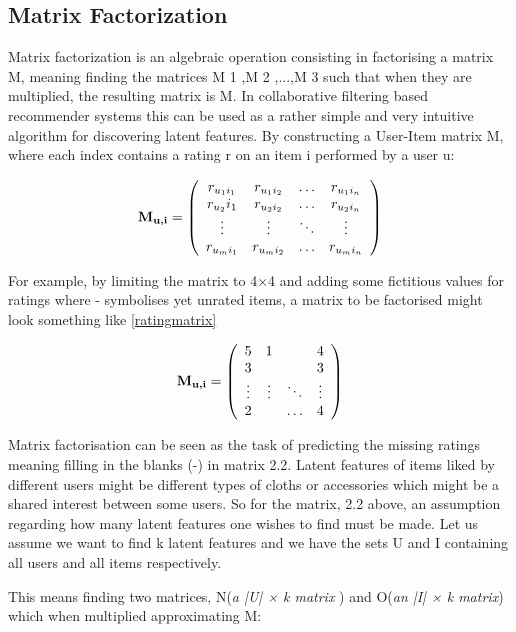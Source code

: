 \subsection{Matrix Factorization}
Matrix factorization is an algebraic operation consisting in factorising a matrix M, meaning finding the matrices M 1 ,M 2 ,...,M 3 such that when they are multiplied, the resulting matrix is M. In collaborative filtering based recommender systems this can be used as a rather simple and very intuitive algorithm for discovering latent features. By constructing a User-Item matrix M, where each index contains a rating r on an item i performed by a user u:

\[  
\label{eq:ratingmatrix}
\textbf{M\textsubscript{u,i}} = \left(
\begin{array}{cccc}
r_{{u_1}{i_1}}&r_{{u_1}{i_2}}& \ldots&r_{{u_1}{i_n}} \\
r_{u_2}{i_1}&r_{{u_2}{i_2}}& \ldots&r_{{u_2}{i_n}} \\
\vdots & \vdots & \ddots & \vdots \\
r_{{u_m}{i_1}}&r_{{u_m}{i_2}}& \ldots&r_{{u_m}{i_n}}
\end{array}
\right)
\]

For example, by limiting the matrix to 4×4 and adding some fictitious values for ratings
where - symbolises yet unrated items, a matrix to be factorised might look something
like \eqref{ratingmatrix}


\[  
\label{eq:numbermatrix}
\textbf{M\textsubscript{u,i}} = \left(
\begin{array}{cccc}
5&1&\-&4 \\
3&\-&\-&3 \\
\vdots & \vdots & \ddots & \vdots \\
2&\-& \ldots&4
\end{array}
\right)
\]

Matrix factorisation can be seen as the task of predicting the missing ratings meaning filling in the blanks (-) in matrix 2.2. Latent features of items liked by different users might be different types of cloths or accessories which might be a shared interest between some users. So for the matrix, 2.2 above, an assumption regarding how many latent features one wishes to find must be made. Let us assume we want to find k latent features and we have the sets U and I containing all users and all items respectively.

This means finding two matrices, N(\textit{a  |U| × k matrix }) and O(\textit{an  |I| × k  matrix}) which when multiplied approximating M:

